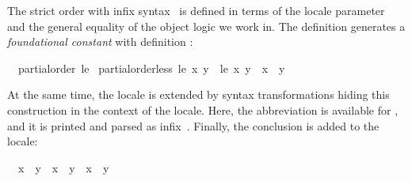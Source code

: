 \begin{isabellebody}
\begin{isamarkuptext}%
The strict order  with infix
  syntax~ is
  defined in terms of the locale parameter~ and the general
  equality of the object logic we work in.  The definition generates a
  \emph{foundational constant}
   with definition :
  \begin{isabelle}%
\ \ partial{}order\ {}le\ {}\isanewline
\isaindent{\ \ }partial{}order{}less\ {}le\ {}x\ {}y\ {}\ {}{}le\ {}x\ {}y\ {}\ {}x\ {}\ {}y{}%
\end{isabelle}
  At the same time, the locale is extended by syntax transformations
  hiding this construction in the context of the locale.  Here, the
  abbreviation  is available for
  , and it is printed
  and parsed as infix~.  Finally, the conclusion  is added to the locale:
  \begin{isabelle}%
\ \ {}{}x\ {}\ {}y{}\ {}\ {}{}x\ {}\ {}y\ {}\ {}x\ {}\ {}y{}%
\end{isabelle}%

\end{isamarkuptext}
\end{isabellebody}
